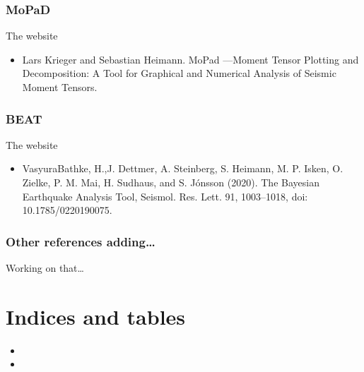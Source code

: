 \documentclass[a4paper,10pt,english,openany]{sphinxmanual}
\begin{document}
\subsection{MoPaD}
\label{\detokenize{references:mopad}}
The  website 
\begin{itemize}
\item {} 
Lars Krieger and Sebastian Heimann. MoPad —Moment Tensor Plotting and Decomposition: A Tool for
Graphical and Numerical Analysis of Seismic Moment Tensors.

\end{itemize}


\subsection{BEAT}
\label{\detokenize{references:beat}}
The  website 
\begin{itemize}
\item {} 
Vasyura\sphinxhyphen{}Bathke, H.,J. Dettmer, A. Steinberg, S. Heimann, M. P. Isken, O. Zielke, P. M. Mai, H. Sudhaus,
and S. Jónsson (2020). The Bayesian Earthquake Analysis Tool, Seismol. Res. Lett. 91, 1003–1018,
doi: 10.1785/0220190075.

\end{itemize}


\subsection{Other references adding…}
\label{\detokenize{references:other-references-adding}}
Working on that…


\chapter{Indices and tables}
\label{\detokenize{index:indices-and-tables}}\begin{itemize}
\item {} 

\item {} 

\end{itemize}



\renewcommand{\indexname}{Index}
\printindex
\end{document}

